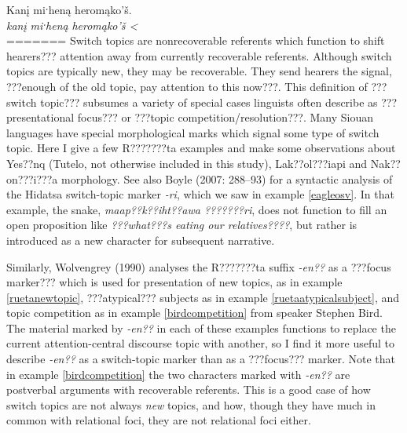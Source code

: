 \documentclass[output=paper]{LSP/langsci}
\begin{document}
\ea\label{ruetaswitchtopic}
\ea\label{ruetanewtopic}
Kanį miˑheną heromąko’š.\footnotemark\\
\gll 	\emph{kanį}	 	\emph{miˑheną} 	\emph{heromąko’š <}\\
=======
	Switch topics are nonrecoverable referents which function to shift hearers??? attention away from currently recoverable referents. Although switch topics are typically new, they may be recoverable. They send hearers the signal, ???enough of the old topic, pay attention to this now???. This definition of ???switch topic??? subsumes a variety of special cases linguists often describe as ???presentational focus??? or ???topic competition/resolution???. Many Siouan languages have special morphological marks which signal some type of switch topic. Here I give a few R???????ta examples and make some observations about Yes??nq (Tutelo, not otherwise included in this study), Lak??ol???iapi and Nak??on???i???a morphology. See also Boyle (2007: 288--93) for a syntactic analysis of the Hidatsa switch-topic marker \emph{-ri}, which we saw in example \ref{eagleosv}. In that example, the snake, \emph{maap??k??iht??awa ???????ri}, does not function to fill an open proposition like \emph{???what???s eating our relatives????}, but rather is introduced as a new character for subsequent narrative.
	
	Similarly, Wolvengrey (1990) analyses the R???????ta suffix \emph{-en??} as a ???focus marker??? which is used for presentation of new topics, as in example \ref{ruetanewtopic}, ???atypical??? subjects as in example \ref{ruetaatypicalsubject}, and topic competition as in example \ref{birdcompetition} from speaker Stephen Bird. The material marked by \emph{-en??} in each of these examples functions to replace the current attention-central discourse topic with another, so I find it more useful to describe \emph{-en??} as a switch-topic marker than as a ???focus??? marker. Note that in example \ref{birdcompetition} the two characters marked with \emph{-en??} are postverbal arguments with recoverable referents. This is a good case of how switch topics are not always \emph{new} topics, and how, though they have much in common with relational foci, they are not relational foci either.
\end{document}
